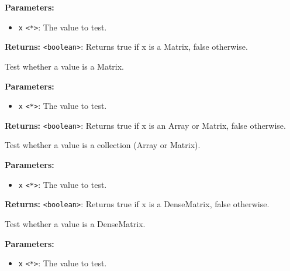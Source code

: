 \documentclass[12pt,a4paper]{article}
\begin{document}
\noindent \textbf{Parameters:}
\begin{itemize}
  \item \texttt{x} \texttt{<*>}: The value to test.
\end{itemize}

\noindent \textbf{Returns:} \texttt{<boolean>}: Returns true if \textasciigrave{}x\textasciigrave{} is a Matrix, false otherwise.

\noindent Test whether a value is a Matrix.

\vspace{5mm}
\noindent {}


\noindent \textbf{Parameters:}
\begin{itemize}
  \item \texttt{x} \texttt{<*>}: The value to test.
\end{itemize}

\noindent \textbf{Returns:} \texttt{<boolean>}: Returns true if \textasciigrave{}x\textasciigrave{} is an Array or Matrix, false otherwise.

\noindent Test whether a value is a collection (Array or Matrix).

\vspace{5mm}
\noindent {}


\noindent \textbf{Parameters:}
\begin{itemize}
  \item \texttt{x} \texttt{<*>}: The value to test.
\end{itemize}

\noindent \textbf{Returns:} \texttt{<boolean>}: Returns true if \textasciigrave{}x\textasciigrave{} is a DenseMatrix, false otherwise.

\noindent Test whether a value is a DenseMatrix.

\vspace{5mm}
\noindent {}


\noindent \textbf{Parameters:}
\begin{itemize}
  \item \texttt{x} \texttt{<*>}: The value to test.
\end{itemize}
\end{document}
